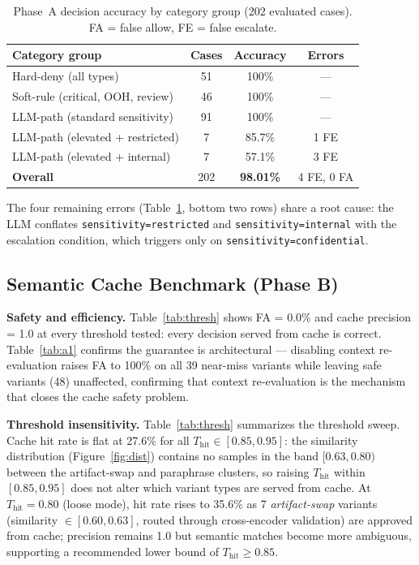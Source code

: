 \documentclass[runningheads]{llncs}
\begin{document}
\begin{table}[t]
\caption{Phase~A decision accuracy by category group (202 evaluated cases).
FA = false allow, FE = false escalate.}
\label{tab:phaseA}
\centering
\renewcommand{\arraystretch}{1}
\begin{tabular}{lccc}
\toprule
Category group & Cases & Accuracy & Errors \\
\midrule
Hard-deny (all types)               & 51  & 100\%   & --- \\
Soft-rule (critical, OOH, review)   & 46  & 100\%   & --- \\
LLM-path (standard sensitivity)     & 91  & 100\%   & --- \\
LLM-path (elevated + restricted)    & 7   & 85.7\%  & 1 FE \\
LLM-path (elevated + internal)      & 7   & 57.1\%  & 3 FE \\
\midrule
\textbf{Overall}                    & 202 & \textbf{98.01\%} & 4 FE, 0 FA \\
\bottomrule
\end{tabular}
\end{table}

\noindent The four remaining errors (Table~\ref{tab:phaseA}, bottom two rows) share a root cause: the LLM conflates \texttt{sensitivity=restricted} and \texttt{sensitivity=internal} with the escalation condition, which triggers only on \texttt{sensitivity=confidential}.

\subsection{Semantic Cache Benchmark (Phase B)}

\noindent\textbf{Safety and efficiency.} Table~\ref{tab:thresh} shows FA = 0.0\% and cache precision = 1.0 at every threshold tested: every decision served from cache is correct. Table~\ref{tab:a1} confirms the guarantee is architectural --- disabling context re-evaluation raises FA to 100\% on all 39 near-miss variants while leaving safe variants (48) unaffected, confirming that context re-evaluation is the mechanism that closes the cache safety problem.

\noindent\textbf{Threshold insensitivity.} Table~\ref{tab:thresh} summarizes the threshold sweep. Cache hit rate is flat at 27.6\% for all $T_{\text{hit}} \in [0.85, 0.95]$: the similarity distribution (Figure~\ref{fig:dist}) contains no samples in the band $[0.63, 0.80)$ between the artifact-swap and paraphrase clusters, so raising $T_{\text{hit}}$ within $[0.85, 0.95]$ does not alter which variant types are served from cache. At $T_{\text{hit}}=0.80$ (loose mode), hit rate rises to 35.6\% as 7 \textit{artifact-swap} variants (similarity $\in [0.60, 0.63]$, routed through cross-encoder validation) are approved from cache; precision remains 1.0 but semantic matches become more ambiguous, supporting a recommended lower bound of $T_{\text{hit}} \geq 0.85$.
\end{document}
